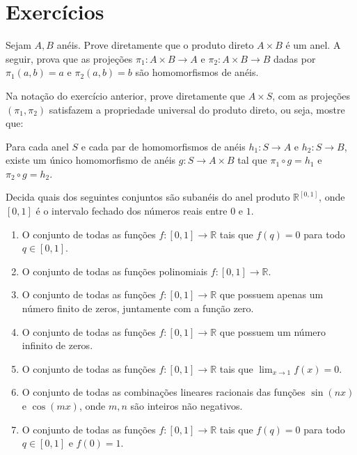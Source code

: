 \section{Exercícios}

\begin{exer}\label{exer:prod_anel}
    Sejam $A, B$ anéis.
    Prove diretamente que o produto direto $A\times B$ é um anel.
    A seguir, prova que as projeções $\pi_1:A\times B\rightarrow A$ e $\pi_2:A\times B\rightarrow B$ dadas por $\pi_1(a, b)=a$ e $\pi_2(a, b)=b$ são homomorfismos de anéis.
\end{exer}

\begin{exer}
    Na notação do exercício anterior, prove diretamente que $A\times S$, com as projeções $(\pi_1, \pi_2)$ satisfazem a propriedade universal do produto direto, ou seja, mostre que:

    Para cada anel $S$ e cada par de homomorfismos de anéis $h_1:S\rightarrow A$ e $h_2:S\rightarrow B$, existe um único homomorfismo de anéis $g:S\rightarrow A\times B$ tal que $\pi_1\circ g=h_1$ e $\pi_2\circ g=h_2$.
\end{exer}
\begin{exer}
Decida quais dos seguintes conjuntos são subanéis do anel produto $\mathbb R^{[0, 1]}$, onde $[0, 1]$ é o intervalo fechado dos números reais entre $0$ e $1$.
\begin{enumerate}[label=\alph*)]
    \item O conjunto de todas as funções $f:[0, 1]\rightarrow \mathbb R$ tais que $f(q)=0$ para todo $q\in [0, 1]$.
    \item O conjunto de todas as funções polinomiais $f:[0, 1]\rightarrow \mathbb R$.
    \item O conjunto de todas as funções $f:[0, 1]\rightarrow \mathbb R$ que possuem apenas um número finito de zeros, juntamente com a função zero.
    \item O conjunto de todas as funções $f:[0, 1]\rightarrow \mathbb R$ que possuem um número infinito de zeros.
    \item O conjunto de todas as funções $f:[0, 1]\rightarrow \mathbb R$ tais que $\lim_{x\rightarrow 1}f(x)=0$.
    \item O conjunto de todas as combinações lineares racionais das funções $\sin(nx)$ e $\cos(mx)$, onde $m,n$ são inteiros não negativos.
    \item O conjunto de todas as funções $f:[0, 1]\rightarrow \mathbb R$ tais que $f(q)=0$ para todo $q\in [0, 1]$ e $f(0)=1$.
\end{enumerate}
\end{exer}

